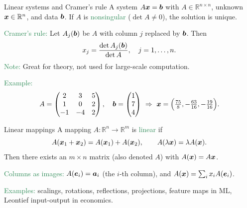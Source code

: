 \documentclass[11pt,aspectratio=169]{beamer}
\begin{document}

\begin{frame}{Linear systems and Cramer's rule}
A system $A\boldsymbol x=\boldsymbol b$ with $A\in\mathbb{R}^{n\times n}$, unknown $\boldsymbol x\in\mathbb{R}^n$, and data $\boldsymbol b$.
If $A$ is \textcolor{SeaGreen}{nonsingular} ($\det A\neq 0$), the solution is unique.
\bigskip

\textcolor{SeaGreen}{Cramer's rule:} Let $A_j(\boldsymbol b)$ be $A$ with column $j$ replaced by $\boldsymbol b$. Then
\[
x_j=\frac{\det A_j(\boldsymbol b)}{\det A},\quad j=1,\ldots,n.
\]
\textcolor{SeaGreen}{Note:} Great for theory, not used for large-scale computation.
\bigskip

\textcolor{SeaGreen}{Example:}
\[
A=\begin{pmatrix}
2 & 3 & 5\\
1 & 0 & 2\\
-1 & -4 & 2
\end{pmatrix},\quad
\boldsymbol b=\begin{pmatrix}1\\7\\4\end{pmatrix}
\ \Rightarrow\
\boldsymbol x=\Big(\tfrac{75}{8},-\tfrac{63}{16},-\tfrac{19}{16}\Big).
\]
\end{frame}


\begin{frame}{Linear mappings}
A mapping $A:\mathbb{R}^n\to\mathbb{R}^m$ is \textcolor{SeaGreen}{linear} if
\[
A(\boldsymbol x_1+\boldsymbol x_2)=A(\boldsymbol x_1)+A(\boldsymbol x_2),\qquad
A(\lambda \boldsymbol x)=\lambda A(\boldsymbol x).
\]
Then there exists an $m\times n$ matrix (also denoted $A$) with $A(\boldsymbol x)=A\boldsymbol x$.
\bigskip

\textcolor{SeaGreen}{Columns as images:} $A(\boldsymbol e_i)=\boldsymbol a_i$ (the $i$-th column), and $A(\boldsymbol x)=\sum_i x_i A(\boldsymbol e_i)$.
\bigskip

\textcolor{SeaGreen}{Examples:} scalings, rotations, reflections, projections, feature maps in ML, Leontief input-output in economics.
\end{frame}
\end{document}
